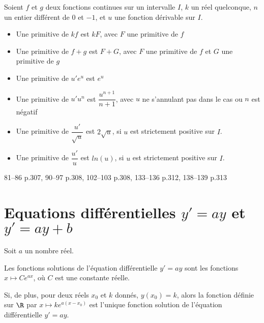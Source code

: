 \documentclass[a4paper]{article}
\begin{document}
\begin{proprieteadm*}{}{}
  Soient $f$ et $g$ deux fonctions continues sur un intervalle $I$, $k$ un réel quelconque, $n$ un entier différent de $0$ et $-1$, et $u$ une fonction dérivable sur $I$.
  \begin{itemize}[label=\textbullet]
    \item Une primitive de $kf$ est $kF$, avec $F$ une primitive de $f$
    \item Une primitive de $f+g$ est $F+G$, avec $F$ une primitive de $f$ et $G$ une primitive de $g$
    \item Une primitive de $u'e^u$ est $e^u$
    \item Une primitive de $u'u^n$ est $\dfrac{u^{n+1}}{n+1}$, avec $u$ ne s'annulant pas dans le cas ou $n$ est négatif
    \item Une primitive de $\dfrac{u'}{\sqrt{u}}$ est $2\sqrt{u}$, si $u$ est strictement positive sur $I$.
    \item Une primitive de $\dfrac{u'}{u}$ est $ln(u)$, si $u$ est strictement positive sur $I$.
  \end{itemize} 
\end{proprieteadm*}

\begin{exercices}{}{}
  81--86 p.307, 90--97 p.308, 102--103 p.308, 133--136 p.312, 138--139 p.313
\end{exercices}


\pagebreak

\section{Equations différentielles $y'=ay$ et $y'=ay+b$}
    \begin{theoreme*}{}{}
    Soit $a$ un nombre réel.

    Les fonctions solutions de l'équation différentielle $y'=ay$ sont les fonctions $x\mapsto Ce^{ax}$, où 
    $C$ est une constante réelle.

    Si, de plus, pour deux réels $x_0$ et $k$ donnés, $y(x_0)=k$, alors la fonction 
    définie sur $\R$ par $x \mapsto ke^{a(x-x_0)}$ est l'unique fonction solution de l'équation différentielle $y'=ay$.
    \end{theoreme*}
\end{document}
